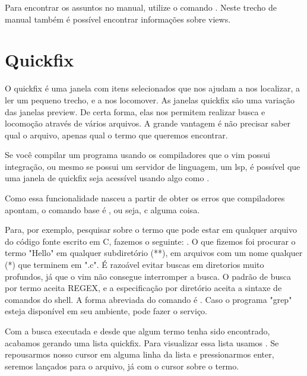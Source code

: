 Para encontrar os assuntos no manual, utilize o comando .
Neste trecho de manual também é possível encontrar informações sobre views.

\section{Quickfix}
O quickfix é uma janela com itens selecionados que nos ajudam a nos localizar, a ler um pequeno trecho, e a nos locomover.
As janelas quickfix são uma variação das janelas preview.
De certa forma, elas nos permitem realizar busca e locomoção através de vários arquivos.
A grande vantagem é não precisar saber qual o arquivo, apenas qual o termo que queremos encontrar.

Se você compilar um programa usando os compiladores que o vim possui integração, ou mesmo se possui um servidor de linguagem,
um lsp, é possível que uma janela de quickfix seja acessível usando algo como .

Como essa funcionalidade nasceu a partir de obter os erros que compiladores apontam, o comando base é , ou seja,
c alguma coisa.

Para, por exemplo, pesquisar sobre o termo  que pode estar em qualquer
arquivo do código fonte escrito em C, fazemos o seguinte: .
O que fizemos foi procurar o termo "Hello" em qualquer subdiretório (**), em arquivos com um nome qualquer (*)
que terminem em ".c".
É razoável evitar buscas em diretorios muito profundos, já que o vim não consegue interromper a busca.
O padrão de busca por termo aceita REGEX, e a especificação por diretório aceita a sintaxe de comandos do shell.
A forma abreviada do comando  é .
Caso o programa "grep" esteja disponível em seu ambiente,  pode fazer o serviço.


Com a busca executada e desde que algum termo tenha sido encontrado, acabamos gerando uma lista quickfix.
Para visualizar essa lista usamos .
Se repousarmos nosso cursor em alguma linha da lista e pressionarmos enter,
seremos lançados para o arquivo, já com o cursor sobre o termo.


